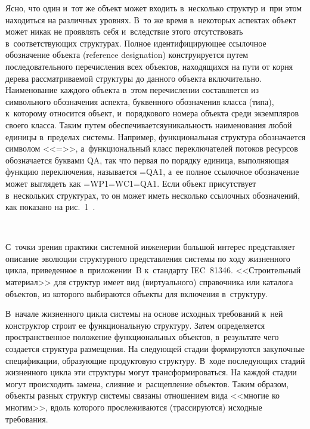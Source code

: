 \begin{multicols}{2}
   Ясно, что один и~тот же объект может входить в~несколько структур и~при 
этом находиться на различных уровнях. В~то же время в~некоторых аспектах 
объект может никак не проявлять себя и~вследствие этого отсутствовать 
в~соответствующих структурах. Полное идентифицирующее ссылочное 
обозначение объекта (reference designation) конструируется путем 
последовательного перечисления всех объектов, находящихся на пути от корня 
дерева рассматриваемой структуры до дан\-ного объекта включительно. 
Наименование каж\-до\-го объекта в~этом перечислении составляется из 
символьного обозначения аспекта, буквенного обозначения класса (типа), 
к~которому относится  объект, и~порядкового номера объекта среди 
экземпляров своего класса. Таким путем обеспечивается\linebreak  уникальность 
наименования любой единицы\linebreak
 в~пределах системы. Например, функциональная 
структура обозначается символом <<=>>, а~функциональный класс 
переключателей потоков ресурсов обозначается буквами QA, так что первая по 
порядку единица, выполняющая функцию переключения, называется =QA1, 
а~ее полное ссылочное обозначение может выглядеть как =WP1=WC1=QA1. 
Если объект присутствует в~нескольких структурах, то он может иметь 
несколько ссылочных обозначений, как показано на рис.~1~\cite{4-kov}.

\begin{figure*} %
    \vspace*{1pt}
\begin{center}
\mbox{%
\epsfxsize=165mm
}
\end{center}
\vspace*{-9pt}
\vspace*{9pt}
\end{figure*}

   С~точки зрения практики системной инженерии большой интерес 
представляет описание эволюции структурного представления системы по ходу 
жизненного цикла, приведенное в~приложении~B к~стандарту IEC~81346. 
<<Строительный материал>> для структур имеет вид (виртуального) 
справочника или каталога объектов, из которого выбираются объекты для 
включения в~структуру. 

В~начале жизненного цикла системы на основе 
исходных требований к~ней конструктор строит ее функциональную структуру. 
Затем определяется пространственное положение функциональных объектов, 
в~результате чего создается структура размещения. На следующей стадии 
формируются закупочные спецификации, образующие продуктовую структуру. 
В~ходе последующих стадий жизненного цикла эти структуры могут 
трансформироваться. На каждой стадии могут происходить замена, слияние 
и~расщепление объектов. Таким образом, объекты разных структур системы 
связаны отношением вида <<многие ко многим>>, вдоль которого 
прослеживаются (трассируются) исходные требования.
   

\end{multicols}
